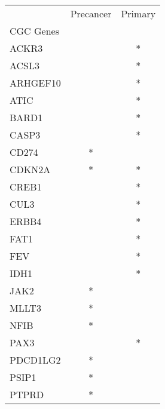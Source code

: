 \begin{tabular}{lcc}
\toprule
{} & Precancer & Primary \\
CGC Genes &           &         \\
\midrule
ACKR3     &           &       * \\
ACSL3     &           &       * \\
ARHGEF10  &           &       * \\
ATIC      &           &       * \\
BARD1     &           &       * \\
CASP3     &           &       * \\
CD274     &         * &         \\
CDKN2A    &         * &       * \\
CREB1     &           &       * \\
CUL3      &           &       * \\
ERBB4     &           &       * \\
FAT1      &           &       * \\
FEV       &           &       * \\
IDH1      &           &       * \\
JAK2      &         * &         \\
MLLT3     &         * &         \\
NFIB      &         * &         \\
PAX3      &           &       * \\
PDCD1LG2  &         * &         \\
PSIP1     &         * &         \\
PTPRD     &         * &         \\
\bottomrule
\end{tabular}
